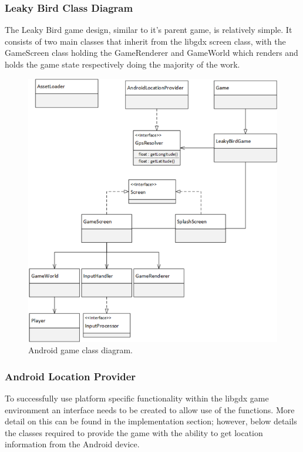 \clearpage
\subsubsection{Leaky Bird Class Diagram}
The Leaky Bird game design, similar to it's parent game,  is relatively simple. It consists of two main classes that inherit from the libgdx screen class, with the GameScreen class holding the GameRenderer and GameWorld which renders and holds the game state respectively doing the majority of the work.

\begin{figure}[h!]
\centering\includegraphics[width=\linewidth]{design/figures/ag-cd.png}
\caption{Android game class diagram.}
\end{figure}
\clearpage
\subsubsection{Android Location Provider}
\label{design:ag-lp-cd}
To successfully use platform specific functionality within the libgdx game environment an interface needs to be created to allow use of the functions. More detail on this can be found in the implementation section; however, below details the classes required to provide the game with the ability to get location information from the Android device.

